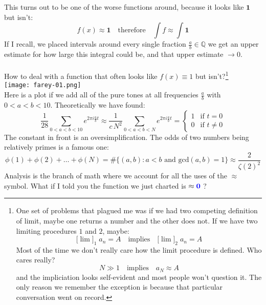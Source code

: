 \documentclass[12pt]{article}
\begin{document}
\newpage

\noindent This turns out to be one of the worse functions around, because it looks like $\mathbf{1}$ but isn't:
$$ f(x) \approx \mathbf{1} \quad\text{therefore}\quad \int f \approx \int \mathbf{1} $$
If I recall, we placed intervals around every single fraction $\frac{a}{b} \in \mathbb{Q}$ we get an upper estimate for how large this integral could be, and that upper estimate $ \to 0$.   \\ \\
How to deal with a function that often looks like $f(x) \equiv 1$ but isn't?\footnote{
One set of problems that plagued me was if we had two competing definition of  limit, maybe one returns a number and the other does not.  If we have two limiting procedures $1$ and $2$, maybe: 
$$ \big[ \lim \big]_1 \; a_n = A \quad\text{implies}\quad \big[ \lim \big]_2 \; a_n = A$$
Most of the time we don't really care how the limit procedure is defined.  Who cares really?
$$ N \gg 1 \quad \text{implies}\quad a_N \approx A$$
and the impliciation looks self-evident and most people won't question it.  The only reason we remember the exception is because that particular conversation went on record.} \\ 
\texttt{[image: farey-01.png]} \\
Here is a plot if we add all of the pure tones at all frequencies $\frac{a}{b}$ with $0 < a < b < 10$.  Theoretically we have found:
$$ \frac{1}{28} \sum_{0 < a < b < 10} e^{2\pi i \frac{a}{b} t} \approx \frac{1}{ c\, N^2 }  \sum_{0 < a < b < N} e^{2\pi i \frac{a}{b} t}
= \left\{ \begin{array}{cc}  1 & \text{if }t = 0 \\ 0 & \text{if }t \neq 0\end{array} \right.  $$
The constant in front is an oversimplification.  The odds of two numbers being relatively primes is a famous one:
$$ \phi(1) + \phi(2) + \dots + \phi(N) = \# \{ (a,b) : a < b \text{ and } \mathrm{gcd}(a,b)=1 \} \approx \frac{2}{\zeta(2)^2} $$
Analysis is the branch of math where we account for all the uses of the $\approx$  symbol.  What if I told you the function we just charted is $\approx {\color{blue}\mathbf{0}}$ ?

\newpage
\end{document}
